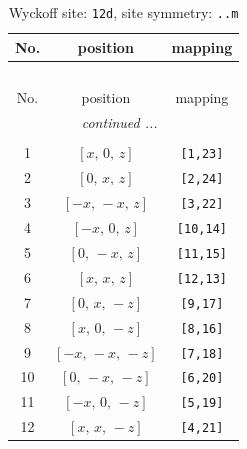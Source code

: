 \documentclass[fleqn,8pt]{jsarticle}
\begin{document}
\renewcommand{\arraystretch}{1.2}
\begin{longtable}{ccc}
\caption{Wyckoff site: {\tt 12d}, site symmetry: {\tt ..m}}
 \\
 \hline \hline
No. & position & mapping \\ \hline \endfirsthead

\multicolumn{2}{l}{\tablename\ \thetable{}} \\
 \hline \hline
No. & position & mapping \\ \hline \endhead

 \hline \hline
\multicolumn{2}{r}{\footnotesize\it continued ...} \\ \endfoot

 \hline \hline
\multicolumn{2}{r}{} \\ \endlastfoot

1 & $\left[ x,\, 0,\, z \right]$ & {\tt [1,23]} \\ \hline
2 & $\left[ 0,\, x,\, z \right]$ & {\tt [2,24]} \\ \hline
3 & $\left[ - x,\, - x,\, z \right]$ & {\tt [3,22]} \\ \hline
4 & $\left[ - x,\, 0,\, z \right]$ & {\tt [10,14]} \\ \hline
5 & $\left[ 0,\, - x,\, z \right]$ & {\tt [11,15]} \\ \hline
6 & $\left[ x,\, x,\, z \right]$ & {\tt [12,13]} \\ \hline
7 & $\left[ 0,\, x,\, - z \right]$ & {\tt [9,17]} \\ \hline
8 & $\left[ x,\, 0,\, - z \right]$ & {\tt [8,16]} \\ \hline
9 & $\left[ - x,\, - x,\, - z \right]$ & {\tt [7,18]} \\ \hline
10 & $\left[ 0,\, - x,\, - z \right]$ & {\tt [6,20]} \\ \hline
11 & $\left[ - x,\, 0,\, - z \right]$ & {\tt [5,19]} \\ \hline
12 & $\left[ x,\, x,\, - z \right]$ & {\tt [4,21]} \\
\end{longtable}
\renewcommand{\arraystretch}{1.2}
\end{document}

